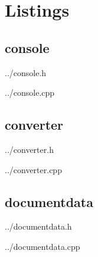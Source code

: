 \section{Listings}

 \subsection{console}
 
	{../console.h}

 
	{../console.cpp}

%  


 \subsection{converter}
 
	{../converter.h}

 
	{../converter.cpp}


 \subsection{documentdata}
 
	{../documentdata.h}

	{../documentdata.cpp}


